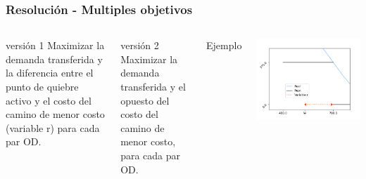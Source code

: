 \documentclass[aspectratio=43, 10pt]{beamer}
\begin{document}
\begin{frame}
    \frametitle{Resolución - Multiples objetivos}

    \begin{columns}[T]
            \begin{block}{versión 1}
                Maximizar la demanda transferida y la diferencia entre el punto de quiebre activo y el costo del camino de menor costo (variable r) para cada par OD.
            \end{block}
            \begin{block}{versión 2}
                Maximizar la demanda transferida y el opuesto del costo del camino de menor costo, para cada par OD.
            \end{block}
            Ejemplo

            \vspace{.5cm}
            \includegraphics[width=1.1\textwidth]{images/r_visualization.png}
    \end{columns}
\end{frame}
\end{document}
